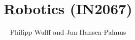 \documentclass[a4paper,11pt]{article}
\title{\color{red2}\textbf{Robotics (IN2067)}}
\author{Philipp Wulff and Jan Hansen-Palmus}
\begin{document}
\rmfamily
\maketitle
\tableofcontents
\newpage







\end{document}

